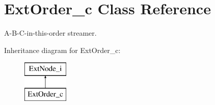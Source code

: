 \hypertarget{classExtOrder__c}{\section{Ext\-Order\-\_\-c Class Reference}
\label{classExtOrder__c}
}


A-\/\-B-\/\-C-\/in-\/this-\/order streamer.  


Inheritance diagram for Ext\-Order\-\_\-c\-:\begin{figure}[H]
\begin{center}
\leavevmode
\includegraphics[height=2.000000cm]{classExtOrder__c}
\end{center}
\end{figure}
